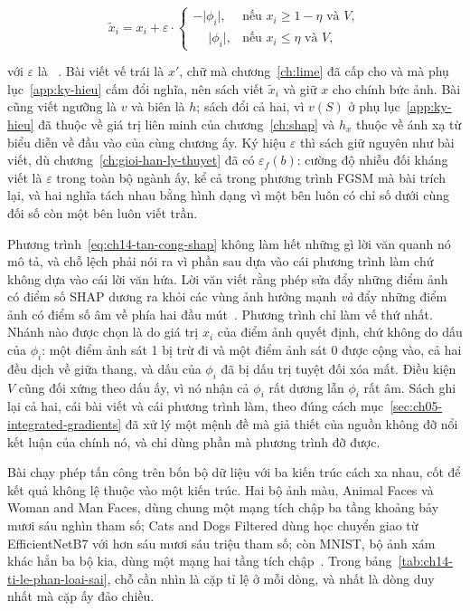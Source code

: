 \begin{equation}
\label{eq:ch14-tan-cong-shap}
\tilde{x}_i = x_i + \varepsilon \cdot
\begin{cases}
-\lvert\phi_i\rvert, & \text{nếu } x_i \ge 1-\eta \text{ và } V,\\
\phantom{-}\lvert\phi_i\rvert, & \text{nếu } x_i \le \eta \text{ và } V,
\end{cases}
\end{equation}

với $\varepsilon$ là ~\autocite{p28shapattack}. Bài viết vế trái là $x'$, chữ mà
chương~\ref{ch:lime} đã cấp cho  và mà phụ lục~\ref{app:ky-hieu} cấm đổi nghĩa, nên sách viết
$\tilde{x}_i$ và giữ $x$ cho chính bức ảnh. Bài cũng viết ngưỡng là $v$ và biên
là $h$; sách đổi cả hai, vì $v(S)$ ở phụ lục~\ref{app:ky-hieu} đã thuộc về giá
trị liên minh của chương~\ref{ch:shap} và $h_x$ thuộc về ánh xạ từ biểu diễn về
đầu vào của cùng chương ấy. Ký hiệu $\varepsilon$ thì sách giữ nguyên như bài
viết, dù chương~\ref{ch:gioi-han-ly-thuyet} đã có $\varepsilon_f(b)$: cường độ
nhiễu đối kháng viết là $\varepsilon$ trong toàn bộ ngành ấy, kể cả trong
phương trình FGSM mà bài trích lại, và hai nghĩa tách nhau bằng hình dạng vì
một bên luôn có chỉ số dưới cùng đối số còn một bên luôn viết trần.

%
Phương trình~\ref{eq:ch14-tan-cong-shap} không làm hết những gì lời văn quanh
nó mô tả, và chỗ lệch phải nói ra vì phần sau dựa vào cái phương trình làm chứ
không dựa vào cái lời văn hứa. Lời văn viết rằng phép sửa đẩy những điểm ảnh có
điểm số SHAP dương ra khỏi các vùng ảnh hưởng mạnh \emph{và} đẩy những điểm ảnh
có điểm số âm về phía hai đầu mút~\autocite{p28shapattack}. Phương trình chỉ
làm vế thứ nhất. Nhánh nào được chọn là do giá trị $x_i$ của điểm ảnh quyết
định, chứ không do dấu của $\phi_i$: một điểm ảnh sát 1 bị trừ đi và một điểm
ảnh sát 0 được cộng vào, cả hai đều dịch về giữa thang, và dấu của $\phi_i$ đã
bị dấu trị tuyệt đối xóa mất. Điều kiện $V$ cũng đối xứng theo dấu ấy, vì nó
nhận cả $\phi_i$ rất dương lẫn $\phi_i$ rất âm. Sách ghi lại cả hai, cái bài
viết và cái phương trình làm, theo đúng cách
mục~\ref{sec:ch05-integrated-gradients} đã xử lý một mệnh đề mà giả thiết của
nguồn không đỡ nổi kết luận của chính nó, và chỉ dùng phần mà phương trình đỡ
được.

%
Bài chạy phép tấn công trên bốn bộ dữ liệu với ba kiến trúc cách xa nhau, cốt
để kết quả không lệ thuộc vào một kiến trúc. Hai bộ ảnh màu, Animal Faces và
Woman and Man Faces, dùng chung một mạng tích chập ba tầng khoảng bảy mươi sáu
nghìn tham số; Cats and Dogs Filtered dùng học chuyển giao từ EfficientNetB7
với hơn sáu mươi sáu triệu tham số; còn MNIST, bộ ảnh xám khác hẳn ba bộ kia,
dùng một mạng hai tầng tích chập~\autocite{p28shapattack}. Trong
bảng~\ref{tab:ch14-ti-le-phan-loai-sai}, chỗ cần nhìn là cặp tỉ lệ ở mỗi dòng,
và nhất là dòng duy nhất mà cặp ấy đảo chiều.

